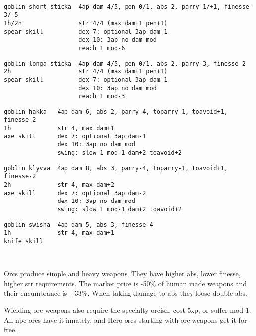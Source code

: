 \

\small \begin{samepage} \begin{verbatim}
goblin short sticka  4ap dam 4/5, pen 0/1, abs 2, parry-1/+1, finesse-3/-5
1h/2h                str 4/4 (max dam+1 pen+1)
spear skill          dex 7: optional 3ap dam-1
                     dex 10: 3ap no dam mod
                     reach 1 mod-6
\end{verbatim} \blocklistgap \begin{verbatim}
goblin longa sticka  4ap dam 4/5, pen 0/1, abs 2, parry-3, finesse-2
2h                   str 4/4 (max dam+1 pen+1)
spear skill          dex 7: optional 3ap dam-1
                     dex 10: 3ap no dam mod
                     reach 1 mod-3
\end{verbatim} \blocklistgap \begin{verbatim}
goblin hakka   4ap dam 6, abs 2, parry-4, toparry-1, toavoid+1, finesse-2
1h             str 4, max dam+1
axe skill      dex 7: optional 3ap dam-1
               dex 10: 3ap no dam mod
               swing: slow 1 mod-1 dam+2 toavoid+2
\end{verbatim} \blocklistgap \begin{verbatim}
goblin klyvva  4ap dam 8, abs 3, parry-4, toparry-1, toavoid+1, finesse-2
2h             str 4, max dam+2
axe skill      dex 7: optional 3ap dam-2
               dex 10: 3ap no dam mod
               swing: slow 1 mod-1 dam+2 toavoid+2 
\end{verbatim} \blocklistgap \begin{verbatim}
goblin swisha  4ap dam 5, abs 3, finesse-4
1h             str 4, max dam+1
knife skill    
\end{verbatim} \end{samepage} \normalsize \goodbreak

\


\goodbreak
\noindent Orcs produce simple and heavy weapons. They have higher abs, lower finesse, higher str requirements. The market price is -50\% of human made weapons and their encumbrance is +33\%. When taking damage to abs they loose double abs.

Wielding orc weapons also require the specialty orcish, cost 5xp, or suffer mod-1.
All npc orcs have it innately, and Hero orcs starting with orc weapons get it for free.

\

